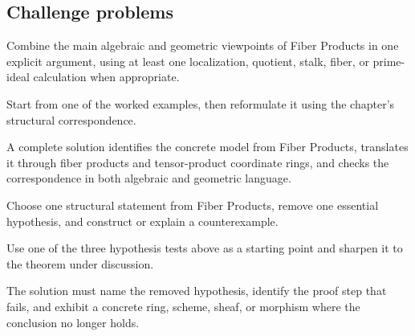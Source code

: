 \subsection*{Challenge problems}

\begin{exercise}\label{exr:vi23-expand-15}
Combine the main algebraic and geometric viewpoints of Fiber Products in one explicit argument, using at least one localization, quotient, stalk, fiber, or prime-ideal calculation when appropriate.
\end{exercise}
\begin{hint}
Start from one of the worked examples, then reformulate it using the chapter's structural correspondence.
\end{hint}
\begin{solution}
A complete solution identifies the concrete model from Fiber Products, translates it through fiber products and tensor-product coordinate rings, and checks the correspondence in both algebraic and geometric language.
\end{solution}

\begin{exercise}\label{exr:vi23-expand-16}
Choose one structural statement from Fiber Products, remove one essential hypothesis, and construct or explain a counterexample.
\end{exercise}
\begin{hint}
Use one of the three hypothesis tests above as a starting point and sharpen it to the theorem under discussion.
\end{hint}
\begin{solution}
The solution must name the removed hypothesis, identify the proof step that fails, and exhibit a concrete ring, scheme, sheaf, or morphism where the conclusion no longer holds.
\end{solution}

